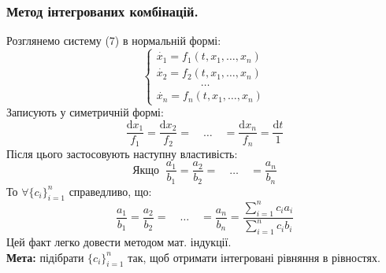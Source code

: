 \documentclass[14pt,a4paper]{scrartcl}
\theoremstyle{definition}
\theoremstyle{definition}
\theoremstyle{definition}
\begin{document}
\subsubsection{Метод інтегрованих комбінацій.}
Розглянемо систему (7) в нормальній формі:
\begin{equation*}
  \begin{cases}
    \dot{x_1} = f_1(t, x_1, \dots, x_n) \\
    \dot{x_2} = f_2(t, x_1, \dots, x_n) \\
    \qquad \qquad \dots \\
    \dot{x_n} = f_n(t, x_1, \dots, x_n)
  \end{cases}
\end{equation*}
Записують у симетричній формі: \\
\begin{equation*}
  \dfrac{\mathrm{d}x_1}{f_1} = \dfrac{\mathrm{d}x_2}{f_2} = \quad \dots \quad = \dfrac{\mathrm{d}x_n}{f_n} = \dfrac{\mathrm{d}t}{1}
\end{equation*}
Після цього застосовують наступну властивість:
\begin{equation*}
  \text{Якщо } \ \dfrac{a_1}{b_1} = \dfrac{a_2}{b_2} = \quad \dots \quad = \dfrac{a_n}{b_n}
\end{equation*}
То $\forall \{c_i\}^n_{i=1} $ справедливо, що: $$ \dfrac{a_1}{b_1} = \dfrac{a_2}{b_2} = \quad \dots \quad = \dfrac{a_n}{b_n} = \dfrac{\sum\limits_{i=1}^{n}c_ia_i}{\sum\limits_{i=1}^{n}c_ib_i}$$ Цей факт легко довести методом мат. індукції. \\ \textbf{Мета:} підібрати $\{c_i\}^n_{i=1}$ так, щоб отримати інтегровані рівняння в рівностях.
\end{document}
